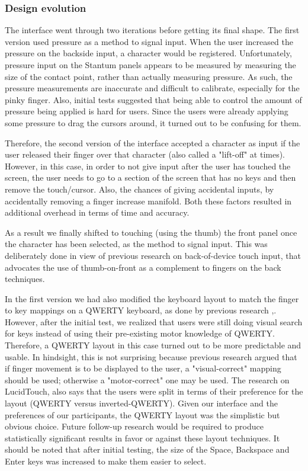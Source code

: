 \subsubsection{Design evolution}

The interface went through two iterations before getting its final shape. The first version used pressure as a method to signal input. When the user increased the pressure on the backside input, a character would be registered.  Unfortunately, pressure input on the Stantum panels appears to be measured by measuring the size of the contact point, rather than actually measuring pressure.  As such, the pressure measurements are inaccurate and difficult to calibrate, especially for the pinky finger. Also, initial tests suggested that being able to control the amount of pressure being applied is hard for users. Since the users were already applying some pressure to drag the cursors around, it turned out to be confusing for them.

Therefore, the second version of the interface accepted a character as input if the user released their finger over that character (also called a "lift-off" at times). However, in this case, in order to not give input after the user has touched the screen, the user needs to go to a section of the screen that has no keys and then remove the touch/cursor. Also, the chances of giving accidental inputs, by accidentally removing a finger increase manifold. Both these factors resulted in additional overhead in terms of time and accuracy.

As a result we finally shifted to touching (using the thumb) the front panel once the character has been selected, as the method to signal input. This was deliberately done in view of previous research on back-of-device touch input, that advocates the use of thumb-on-front as a complement to fingers on the back techniques. \cite{Wobbrock} 

In the first version we had also modified the keyboard layout to match the finger to key mappings on a QWERTY keyboard, as done by previous research \cite{RearType},\cite{LucidTouch}. However, after the initial test, we realized that users were still doing visual search for keys instead of using their pre-existing motor knowledge of QWERTY. Therefore, a QWERTY layout in this case turned out to be more predictable and usable. In hindsight, this is not surprising because previous research \cite{Wobbrock} argued that if finger movement is to be displayed to the user, a "visual-correct" mapping should be used; otherwise a "motor-correct" one may be used. The research on LucidTouch, also says that the users were split in terms of their preference for the layout (QWERTY versus inverted-QWERTY). Given our interface and the preferences of our participants, the QWERTY layout was the simplistic but obvious choice. Future follow-up research would be required to produce statistically significant results in favor or against these layout techniques. It should be noted that after initial testing, the size of the Space, Backspace and Enter keys was increased to make them easier to select.

